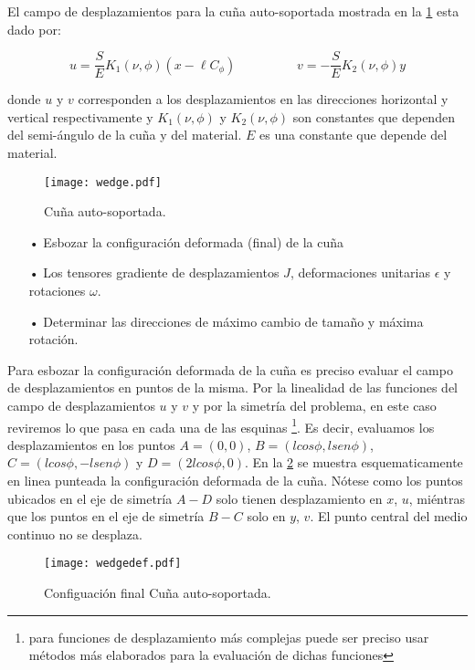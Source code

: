 \documentclass[../notas medios.tex]{subfiles}
\begin{document}
El campo de desplazamientos para la cuña auto-soportada mostrada en la \cref{wedge} esta dado por:

\begin{equation*}	
	u = \frac{S}{E}{K_1}\left( {\nu ,\phi } \right)\left( {x - \ell {C_\phi }} \right)
	\hspace{2cm}
	v =  - \frac{S}{E}{K_2}\left( {\nu ,\phi } \right)y
\end{equation*}

donde $u$ y $v$ corresponden a los desplazamientos en las direcciones horizontal y vertical respectivamente y ${K_1}\left( {\nu ,\phi } \right)$ y ${K_2}\left( {\nu ,\phi } \right)$ son constantes que dependen del semi-ángulo de la cuña y del material. $E$ es una constante que depende del material. 
\begin{figure}[H]
\centering
	\texttt{[image: wedge.pdf]}
	\caption{Cuña auto-soportada.}
	\label{wedge}
\end{figure}

\begin{itemize}
\item[•] Esbozar la configuración deformada (final) de la cuña
\item[•] Los tensores gradiente de desplazamientos $J$, deformaciones unitarias $\epsilon$ y rotaciones $\omega$.
\item[•] Determinar las direcciones de máximo cambio de tamaño y máxima rotación.
\end{itemize}

Para esbozar la configuración deformada de la cuña es preciso evaluar el campo de desplazamientos en puntos de la misma. Por la linealidad de las funciones del campo de desplazamientos $u$ y $v$ y por la simetría del problema, en este caso reviremos lo que pasa en cada una de las esquinas \footnote{para funciones de desplazamiento más complejas puede ser preciso usar métodos más elaborados para la evaluación de dichas funciones}. Es decir, evaluamos los desplazamientos en los puntos $A = (0,0)$,  $B = (lcos\phi,l sen\phi)$, $C = (lcos\phi,-lsen\phi)$ y $D = (2lcos\phi,0)$. En la \cref{wedgedef} se muestra esquematicamente en linea punteada la configuración deformada de la cuña. Nótese  como los puntos ubicados en el eje de simetría $A-D$ solo tienen desplazamiento en $x$, $u$, miéntras que los puntos en el eje de simetría $B-C$ solo en $y$, $v$. El punto central del medio continuo no se desplaza. 

\begin{figure}[H]
\centering
	\texttt{[image: wedgedef.pdf]}
	\caption{Configuación final Cuña auto-soportada.}
	\label{wedgedef}
\end{figure}
\end{document}
